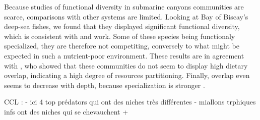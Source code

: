 Because studies of functional diversity in submarine canyons communities are scarce, comparisons with other systems are limited. Looking at Bay of Biscay's deep-sea fishes, we found that they displayed significant functional diversity, which is consistent with \citet{aneeshkumar2017} and \citet{carrington2021} work. Some of these species being functionaly specialized, they are therefore not competiting, conversely to what might be expected in such a nutrient-poor environment. These results are in agreement with \citet{preciado2017}, who showed that these communities do not seem to display high dietary overlap, indicating a high degree of resources partitioning. Finally, overlap even seems to decrease with depth, because specialization is stronger \citep{carrasson2002,farre2016}. 



CCL :
- ici 4 top prédators qui ont des niches très différentes
- miallons trphiques infs ont des niches qui se chevauchent + 